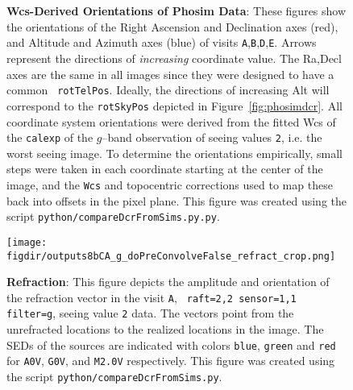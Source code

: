 \documentclass[prd, nofootinbib, floatfix, 11pt, tightenlines, times]{article}
\def\figdir{../figures}
\def\A{{\tt A}}
\def\B{{\tt B}}
\def\D{{\tt D}}
\def\E{{\tt E}}
\begin{document}
\begin{figure}
    \centering
    \qquad
     \\
    \qquad
     \\
    \caption{{\bf Wcs-Derived Orientations of Phosim Data}: These
      figures show the orientations of the Right Ascension and
      Declination axes (red), and Altitude and Azimuth axes (blue) of
      visits \A,\B,\D,\E.  Arrows represent the directions of {\it
        increasing} coordinate value.  The Ra,Decl axes are the same
      in all images since they were designed to have a common {\tt
        rotTelPos}.  Ideally, the directions of increasing Alt will
      correspond to the {\tt rotSkyPos} depicted in
      Figure~\ref{fig:phosimdcr}.  All coordinate system orientations
      were derived from the fitted Wcs of the {\tt calexp} of the
      $g$--band observation of seeing values {\tt 2}, i.e. the worst seeing
      image.  To determine the orientations empirically, small steps
      were taken in each coordinate starting at the center of the
      image, and the {\tt Wcs} and topocentric corrections used to map
      these back into offsets in the pixel plane.  This figure was
      created using the script {\tt python/compareDcrFromSims.py.py}.}
    \label{fig:wcsdcr}
\end{figure}

\begin{figure}[h!]
  \centering
  \texttt{[image: \\figdir/outputs8bCA\_g\_doPreConvolveFalse\_refract\_crop.png]}
  \caption{{\bf Refraction}: This figure depicts the amplitude and
    orientation of the refraction vector in the visit \A, {\tt
      raft=2,2 sensor=1,1 filter=g}, seeing value {\tt 2} data.  The
    vectors point from the unrefracted locations to the realized
    locations in the image.  The SEDs of the sources are indicated
    with colors {\tt blue}, {\tt green} and {\tt red} for {\tt A0V},
    {\tt G0V}, and {\tt M2.0V} respectively.  This figure was created
    using the script {\tt python/compareDcrFromSims.py}.}
  \label{fig:refractim}
\end{figure}
\end{document}
